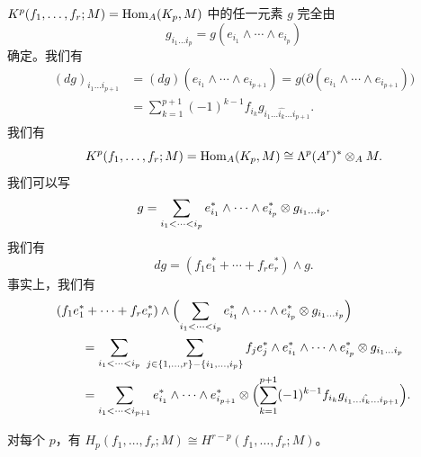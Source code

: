 $K^p(f_1,\dots,f_r;M)=\operatorname{Hom}_A(K_p,M)$ 中的任一元素 $g$ 完全由
\[
g_{i_1\dots i_p}=g(e_{i_1}\wedge\cdots\wedge e_{i_p})
\]
确定。我们有
\[
\begin{aligned}
(dg)_{i_1\dots i_{p+1}}&=(dg)(e_{i_1}\wedge\cdots\wedge e_{i_{p+1}})
=g\bigl(\partial(e_{i_1}\wedge\cdots\wedge e_{i_{p+1}})\bigr)\\
&=\sum_{k=1}^{p+1}(-1)^{k-1}f_{i_k}g_{i_1\dots\hat{i_k}\dots i_{p+1}}.
\end{aligned}
\]
我们有
\[
K^p(f_1,\dots,f_r;M)=\operatorname{Hom}_A(K_p,M)\cong\Lambda^p(A^r)^{*}\otimes_A M.
\]
我们可以写
\[
g=\sum_{i_1<\cdots<i_p}e_{i_1}^{*}\wedge\cdots\wedge e_{i_p}^{*}\otimes g_{i_1\dots i_p}.
\]
我们有
\[
dg=(f_1e_1^{*}+\cdots+f_re_r^{*})\wedge g.
\]
事实上，我们有
\[
\begin{aligned}
&(f_1e_1^{*}+\cdots+f_re_r^{*})\wedge\Bigl(\sum_{i_1<\cdots<i_p}e_{i_1}^{*}\wedge\cdots\wedge e_{i_p}^{*}\tensor g_{i_1\dots i_p}\Bigr)\\
&\qquad=\sum_{i_1<\cdots<i_p}\ \sum_{j\in\{1,\dots,r\}-\{i_1,\dots,i_p\}}
f_je_j^{*}\wedge e_{i_1}^{*}\wedge\cdots\wedge e_{i_p}^{*}\tensor g_{i_1\dots i_p}\\
&\qquad=\sum_{i_1<\cdots<i_{p+1}}e_{i_1}^{*}\wedge\cdots\wedge e_{i_{p+1}}^{*}
\tensor\Bigl(\sum_{k=1}^{p+1}(-1)^{k-1}f_{i_k}g_{i_1\dots\hat{i_k}\dots i_{p+1}}\Bigr).
\end{aligned}
\]

\begin{proposition}\label{it:2.4.1}
对每个 $p$，有 $H_p(f_1,\dots,f_r;M)\cong H^{r-p}(f_1,\dots,f_r;M)$。
\end{proposition}

